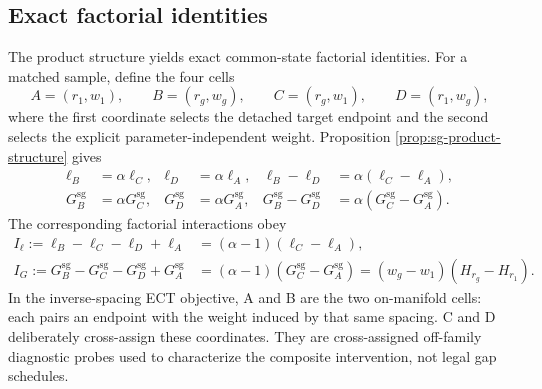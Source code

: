 \documentclass{article}
\newif\ifshowcomments
\newcommand{\theorynote}[1]{%
  \ifshowcomments{\color{theoryblue}\textbf{[THEORY CHECK: #1]}}\fi}
\newcommand{\claimnote}[1]{%
  \ifshowcomments{\color{claimpurple}\textbf{[CLAIM CEILING: #1]}}\fi}
\begin{document}
\theorynote{Weights not held fixed during the one-sided derivative, including
undetached residual-dependent or learned weights, require additional
derivative terms and are outside
Proposition~\ref{prop:sg-product-structure}. Do not replace the fail-closed
$e=0$ audit rule with an assumed implementation convention.}

\subsection{Exact factorial identities}
\label{sec:theory-factorial-identities}

The product structure yields exact common-state factorial identities. For a
matched sample, define the four cells
\begin{equation}
  A=(r_1,w_1),\qquad
  B=(r_g,w_g),\qquad
  C=(r_g,w_1),\qquad
  D=(r_1,w_g),
  \label{eq:factorial-cells}
\end{equation}
where the first coordinate selects the detached target endpoint and the second
selects the explicit parameter-independent weight. Proposition
\ref{prop:sg-product-structure} gives
\begin{align}
  \ell_B&=\alpha\ell_C,&
  \ell_D&=\alpha\ell_A,&
  \ell_B-\ell_D&=\alpha(\ell_C-\ell_A),
  \label{eq:factorial-loss-identities}\\
  G_B^{\mathrm{sg}}&=\alpha G_C^{\mathrm{sg}},&
  G_D^{\mathrm{sg}}&=\alpha G_A^{\mathrm{sg}},&
  G_B^{\mathrm{sg}}-G_D^{\mathrm{sg}}
  &=\alpha(G_C^{\mathrm{sg}}-G_A^{\mathrm{sg}}).
  \label{eq:factorial-gradient-identities}
\end{align}
The corresponding factorial interactions obey
\begin{align}
  I_\ell:=\ell_B-\ell_C-\ell_D+\ell_A
  &=(\alpha-1)(\ell_C-\ell_A),\\
  I_G:=G_B^{\mathrm{sg}}-G_C^{\mathrm{sg}}
      -G_D^{\mathrm{sg}}+G_A^{\mathrm{sg}}
  &=(\alpha-1)(G_C^{\mathrm{sg}}-G_A^{\mathrm{sg}})
    =(w_g-w_1)(H_{r_g}-H_{r_1}).
  \label{eq:exact-factorial-interactions}
\end{align}
In the inverse-spacing ECT objective, A and B are the two on-manifold cells:
each pairs an endpoint with the weight induced by that same spacing. C and D
deliberately cross-assign these coordinates. They are cross-assigned off-family
diagnostic probes used to characterize the composite intervention, not legal gap
schedules.

\claimnote{Describe C and D as cross-assigned off-family diagnostic probes. Do not present
them as legal independent schedules or as a $q\times g$ factorial.}
\end{document}
